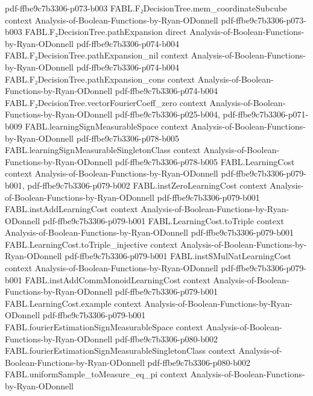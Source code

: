 \begin{theorem}
  {pdf-ffbe9c7b3306-p073-b003}
\proofstep
  {FABL.F₂DecisionTree.mem_coordinateSubcube}
  {context}
  {Analysis-of-Boolean-Functions-by-Ryan-ODonnell}
  {pdf-ffbe9c7b3306-p073-b003}
\proofstep
  {FABL.F₂DecisionTree.pathExpansion}
  {direct}
  {Analysis-of-Boolean-Functions-by-Ryan-ODonnell}
  {pdf-ffbe9c7b3306-p074-b004}
\proofstep
  {FABL.F₂DecisionTree.pathExpansion_nil}
  {context}
  {Analysis-of-Boolean-Functions-by-Ryan-ODonnell}
  {pdf-ffbe9c7b3306-p074-b004}
\proofstep
  {FABL.F₂DecisionTree.pathExpansion_cons}
  {context}
  {Analysis-of-Boolean-Functions-by-Ryan-ODonnell}
  {pdf-ffbe9c7b3306-p074-b004}
\proofstep
  {FABL.F₂DecisionTree.vectorFourierCoeff_zero}
  {context}
  {Analysis-of-Boolean-Functions-by-Ryan-ODonnell}
  {pdf-ffbe9c7b3306-p025-b004,
    pdf-ffbe9c7b3306-p071-b009}
\proofstep
  {FABL.learningSignMeasurableSpace}
  {context}
  {Analysis-of-Boolean-Functions-by-Ryan-ODonnell}
  {pdf-ffbe9c7b3306-p078-b005}
\proofstep
  {FABL.learningSignMeasurableSingletonClass}
  {context}
  {Analysis-of-Boolean-Functions-by-Ryan-ODonnell}
  {pdf-ffbe9c7b3306-p078-b005}
\proofstep
  {FABL.LearningCost}
  {context}
  {Analysis-of-Boolean-Functions-by-Ryan-ODonnell}
  {pdf-ffbe9c7b3306-p079-b001,
    pdf-ffbe9c7b3306-p079-b002}
\proofstep
  {FABL.instZeroLearningCost}
  {context}
  {Analysis-of-Boolean-Functions-by-Ryan-ODonnell}
  {pdf-ffbe9c7b3306-p079-b001}
\proofstep
  {FABL.instAddLearningCost}
  {context}
  {Analysis-of-Boolean-Functions-by-Ryan-ODonnell}
  {pdf-ffbe9c7b3306-p079-b001}
\proofstep
  {FABL.LearningCost.toTriple}
  {context}
  {Analysis-of-Boolean-Functions-by-Ryan-ODonnell}
  {pdf-ffbe9c7b3306-p079-b001}
\proofstep
  {FABL.LearningCost.toTriple_injective}
  {context}
  {Analysis-of-Boolean-Functions-by-Ryan-ODonnell}
  {pdf-ffbe9c7b3306-p079-b001}
\proofstep
  {FABL.instSMulNatLearningCost}
  {context}
  {Analysis-of-Boolean-Functions-by-Ryan-ODonnell}
  {pdf-ffbe9c7b3306-p079-b001}
\proofstep
  {FABL.instAddCommMonoidLearningCost}
  {context}
  {Analysis-of-Boolean-Functions-by-Ryan-ODonnell}
  {pdf-ffbe9c7b3306-p079-b001}
\proofstep
  {FABL.LearningCost.example}
  {context}
  {Analysis-of-Boolean-Functions-by-Ryan-ODonnell}
  {pdf-ffbe9c7b3306-p079-b001}
\proofstep
  {FABL.fourierEstimationSignMeasurableSpace}
  {context}
  {Analysis-of-Boolean-Functions-by-Ryan-ODonnell}
  {pdf-ffbe9c7b3306-p080-b002}
\proofstep
  {FABL.fourierEstimationSignMeasurableSingletonClass}
  {context}
  {Analysis-of-Boolean-Functions-by-Ryan-ODonnell}
  {pdf-ffbe9c7b3306-p080-b002}
\proofstep
  {FABL.uniformSample_toMeasure_eq_pi}
  {context}
  {Analysis-of-Boolean-Functions-by-Ryan-ODonnell}

\end{theorem}
